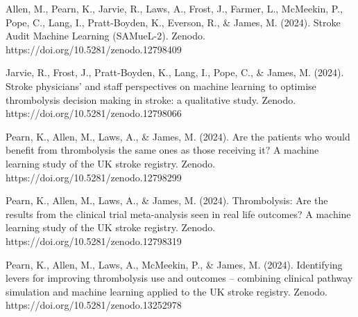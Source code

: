Allen, M., Pearn, K., Jarvie, R., Laws, A., Frost, J., Farmer, L., McMeekin, P., Pope, C., Lang, I., Pratt-Boyden, K., Everson, R., & James, M. (2024). Stroke Audit Machine Learning (SAMueL-2). Zenodo. https://doi.org/10.5281/zenodo.12798409

Jarvie, R., Frost, J., Pratt-Boyden, K., Lang, I., Pope, C., & James, M. (2024). Stroke physicians' and staff perspectives on machine learning to optimise thrombolysis decision making in stroke: a qualitative study. Zenodo. https://doi.org/10.5281/zenodo.12798066

Pearn, K., Allen, M., Laws, A., & James, M. (2024). Are the patients who would benefit from thrombolysis the same ones as those receiving it? A machine learning study of the UK stroke registry. Zenodo. https://doi.org/10.5281/zenodo.12798299

Pearn, K., Allen, M., Laws, A., & James, M. (2024). Thrombolysis: Are the results from the clinical trial meta-analysis seen in real life outcomes?  A machine learning study of the UK stroke registry. Zenodo. https://doi.org/10.5281/zenodo.12798319

Pearn, K., Allen, M., Laws, A., McMeekin, P., & James, M. (2024). Identifying levers for improving thrombolysis use and outcomes – combining clinical pathway simulation and machine learning applied to the UK stroke registry. Zenodo. https://doi.org/10.5281/zenodo.13252978